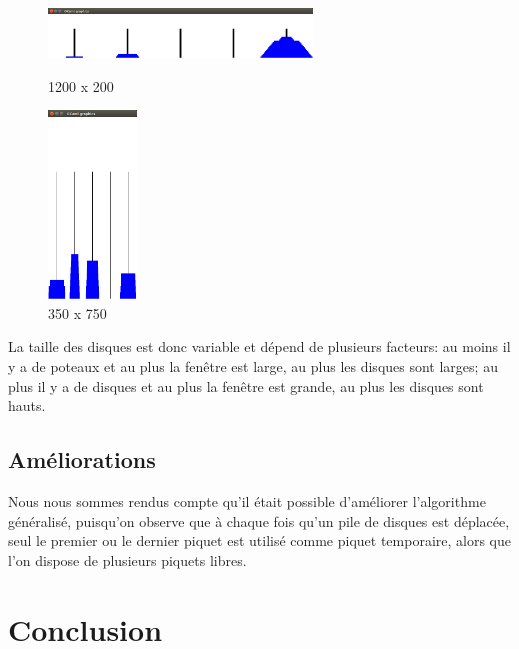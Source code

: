\documentclass[a4paper, 11pt]{article}%
\begin{document}
		\begin{figure}[!h]
			\begin{center}
			  \includegraphics[width=7cm]{hanoi_wide.png}
			  \caption{1200 x 200}
			\end{center}
			\endminipage\hfill
			\begin{center}
			  \includegraphics[height=5cm]{hanoi_tall.png}
			  \caption{350 x 750}
			\end{center}
			\endminipage\hfill
		\end{figure}
	
		La taille des disques est donc variable et dépend de plusieurs
		facteurs: au moins il y a de poteaux et au plus la fenêtre est
		large, au plus les disques sont larges; au plus il y a de disques
		et au plus la fenêtre est grande, au plus les disques sont hauts.
	
	\subsection{Améliorations}
		Nous nous sommes rendus compte qu'il était possible d'améliorer
		l'algorithme généralisé, puisqu'on observe que à chaque fois
		qu'un pile de disques est déplacée, seul le premier ou le dernier
		piquet est utilisé comme piquet temporaire, alors que l'on dispose
		de plusieurs piquets libres.
	
\section*{Conclusion}
\end{document}
